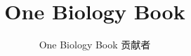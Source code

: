 \documentclass[11pt,a4paper,twoside,openany]{book}
\title{One Biology Book}
\author{One Biology Book 贡献者}
\date{\bookdate}
\begin{document}
\frontmatter




\tableofcontents

\mainmatter



\appendix
\part{\omsolutionspart}


\backmatter
\printindex
\end{document}

